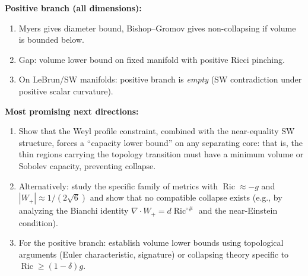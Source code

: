 \textbf{Positive branch (all dimensions):}
\begin{enumerate}
\item Myers gives diameter bound, Bishop--Gromov gives non-collapsing
  if volume is bounded below.
\item Gap: volume lower bound on fixed manifold with positive Ricci pinching.
\item On LeBrun/SW manifolds: positive branch is \emph{empty} (SW contradiction
  under positive scalar curvature).
\end{enumerate}

\textbf{Most promising next directions:}
\begin{enumerate}
\item Show that the Weyl profile constraint, combined with the
  near-equality SW structure, forces a ``capacity lower bound'' on any
  separating core: that is, the thin regions carrying the topology
  transition must have a minimum volume or Sobolev capacity, preventing
  collapse.
\item Alternatively: study the specific family of metrics with
  \(\operatorname{Ric}\approx-g\) and \(|W_+|\approx1/(2\sqrt6)\) and
  show that no compatible collapse exists (e.g., by analyzing the
  Bianchi identity \(\nabla\cdot W_+=d\operatorname{Ric}^{\circ\#}\)
  and the near-Einstein condition).
\item For the positive branch: establish volume lower bounds using
  topological arguments (Euler characteristic, signature) or collapsing
  theory specific to \(\operatorname{Ric}\ge(1-\delta)g\).
\end{enumerate}

